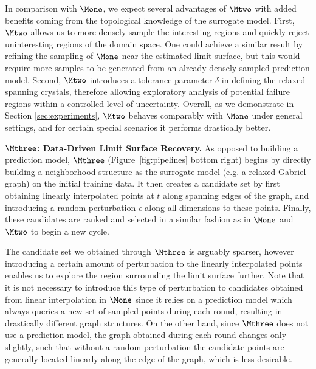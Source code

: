 In comparison with $\Mone$, we expect several advantages of $\Mtwo$ with added benefits coming from the topological knowledge of the surrogate model.
%
First, $\Mtwo$ allows us to more densely sample the interesting regions and quickly reject uninteresting regions of the domain space. One could achieve a similar result by refining the sampling of $\Mone$ near the estimated limit surface, but this would require more samples to be generated from an already densely sampled prediction model.
%
Second, $\Mtwo$ introduces a tolerance parameter $\delta$ in defining the relaxed spanning crystals, therefore allowing exploratory analysis of potential failure regions within a controlled level of uncertainty.
%
Overall, as we demonstrate in Section \ref{sec:experiments}, $\Mtwo$ behaves comparably with $\Mone$ under general settings, and for certain special scenarios it performs drastically better.




\noindent\textbf{$\Mthree$: Data-Driven Limit  Surface Recovery.}
As opposed to building a prediction model, $\Mthree$ (Figure~\ref{fig:pipelines} bottom right) begins by directly building a neighborhood structure as the surrogate model (e.g. a relaxed Gabriel graph) on the initial training data.
%
It then creates a candidate set by first obtaining linearly interpolated points at $t$ along spanning edges of the graph, and introducing a random perturbation $\epsilon$ along all dimensions to these points.
%
Finally, these candidates are ranked and selected in a similar fashion as in $\Mone$ and $\Mtwo$ to begin a new cycle.

The candidate set we obtained through $\Mthree$ is arguably sparser, however introducing a certain amount of perturbation to the linearly interpolated points enables us to explore the region surrounding the limit surface further.
%
Note that it is not necessary to introduce this type of perturbation to candidates obtained from linear interpolation in $\Mone$ since it relies on a prediction model which always queries a new set of sampled points during each round, resulting in drastically different graph structures.
%
On the other hand, since $\Mthree$ does not use a prediction model, the graph obtained during each round changes only slightly, such that without a random perturbation the candidate points are generally located linearly along the edge of the graph, which is less desirable.


